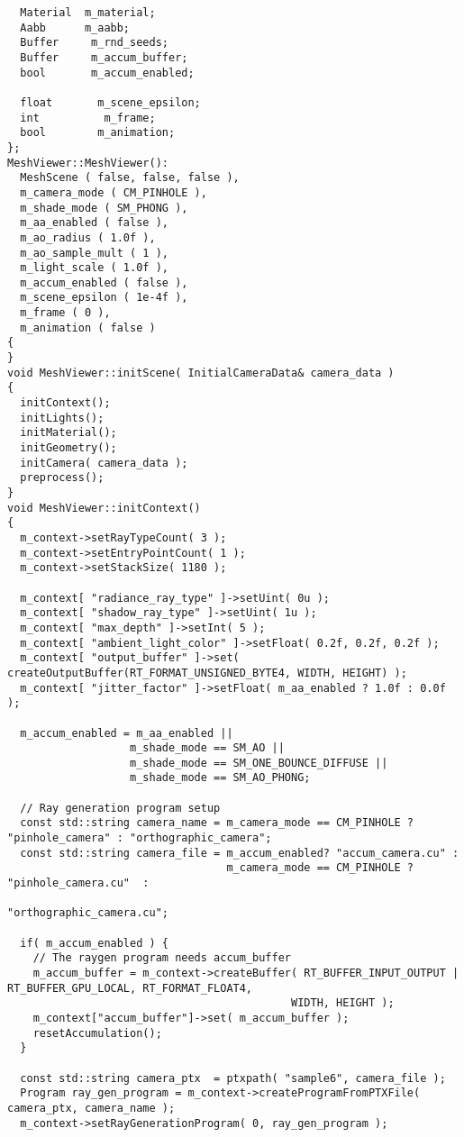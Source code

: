 \begin{verbatim}
  Material  m_material;
  Aabb      m_aabb;
  Buffer     m_rnd_seeds;
  Buffer     m_accum_buffer;
  bool       m_accum_enabled;

  float       m_scene_epsilon;
  int          m_frame;
  bool        m_animation;
};
MeshViewer::MeshViewer():
  MeshScene ( false, false, false ),
  m_camera_mode ( CM_PINHOLE ),
  m_shade_mode ( SM_PHONG ),
  m_aa_enabled ( false ),
  m_ao_radius ( 1.0f ),
  m_ao_sample_mult ( 1 ),
  m_light_scale ( 1.0f ),
  m_accum_enabled ( false ),
  m_scene_epsilon ( 1e-4f ),
  m_frame ( 0 ),
  m_animation ( false )
{
}
void MeshViewer::initScene( InitialCameraData& camera_data )
{
  initContext();
  initLights();
  initMaterial();
  initGeometry();
  initCamera( camera_data );
  preprocess();
}
void MeshViewer::initContext()
{
  m_context->setRayTypeCount( 3 );
  m_context->setEntryPointCount( 1 );
  m_context->setStackSize( 1180 );

  m_context[ "radiance_ray_type" ]->setUint( 0u );
  m_context[ "shadow_ray_type" ]->setUint( 1u );
  m_context[ "max_depth" ]->setInt( 5 );
  m_context[ "ambient_light_color" ]->setFloat( 0.2f, 0.2f, 0.2f );
  m_context[ "output_buffer" ]->set( createOutputBuffer(RT_FORMAT_UNSIGNED_BYTE4, WIDTH, HEIGHT) );
  m_context[ "jitter_factor" ]->setFloat( m_aa_enabled ? 1.0f : 0.0f );
  
  m_accum_enabled = m_aa_enabled ||
                   m_shade_mode == SM_AO ||
                   m_shade_mode == SM_ONE_BOUNCE_DIFFUSE ||
                   m_shade_mode == SM_AO_PHONG;

  // Ray generation program setup
  const std::string camera_name = m_camera_mode == CM_PINHOLE ? "pinhole_camera" : "orthographic_camera"; 
  const std::string camera_file = m_accum_enabled? "accum_camera.cu" :
                                  m_camera_mode == CM_PINHOLE ? "pinhole_camera.cu"  :
                                                               "orthographic_camera.cu";

  if( m_accum_enabled ) {
    // The raygen program needs accum_buffer
    m_accum_buffer = m_context->createBuffer( RT_BUFFER_INPUT_OUTPUT | RT_BUFFER_GPU_LOCAL, RT_FORMAT_FLOAT4,
                                            WIDTH, HEIGHT );
    m_context["accum_buffer"]->set( m_accum_buffer );
    resetAccumulation();
  }

  const std::string camera_ptx  = ptxpath( "sample6", camera_file );
  Program ray_gen_program = m_context->createProgramFromPTXFile( camera_ptx, camera_name );
  m_context->setRayGenerationProgram( 0, ray_gen_program );



\end{verbatim}
